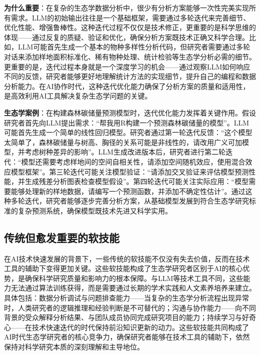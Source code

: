 \documentclass[
]{book}
\begin{document}
\textbf{为什么重要}：在复杂的生态学数据分析中，很少有分析方案能够一次性完美实现所有需求。LLM的初始输出往往是一个基础框架，需要通过多轮迭代来完善细节、优化性能、增强鲁棒性。这种迭代过程不仅仅是技术修正，更重要的是科学思维的体现------通过反复的质疑、验证和优化，确保分析方案既技术正确又科学合理。比如，LLM可能首先生成一个基本的物种多样性分析代码，但研究者需要通过多轮对话来添加样地面积标准化、稀有物种处理、统计检验等生态学分析必需的细节。更重要的是，迭代过程本身就是一个深度学习的机会------通过观察LLM如何响应不同的反馈，研究者能够更好地理解统计方法的实现细节，提升自己的编程和数据分析能力。在AI协作时代，这种迭代优化能力确保了分析方案的质量和适用性，是高效利用AI工具解决复杂生态学问题的关键。

\textbf{生态学案例}：在构建森林碳储量预测模型时，迭代优化能力发挥着关键作用。假设研究者首先向LLM提出需求：``帮我用R构建一个预测森林碳储量的模型''。LLM可能首先生成一个简单的线性回归模型。研究者通过第一轮迭代反馈：``这个模型太简单了，森林碳储量与树高、胸径的关系可能是非线性的，请改用广义可加模型，并考虑树种差异的影响''。LLM生成改进版本后，研究者进行第二轮迭代：``模型还需要考虑样地间的空间自相关性，请添加空间随机效应，使用混合效应模型框架''。第三轮迭代可能关注模型验证：``请添加交叉验证来评估模型预测性能，并生成残差分析图表检查模型假设''。第四轮迭代可能关注实际应用：``模型需要能够处理新的样地数据，请编写一个预测函数，并添加不确定性估计''。通过这种多轮迭代，研究者能够逐步完善分析方案，从基础模型发展到符合生态学研究标准的复杂预测系统，确保模型既技术先进又科学实用。

\hypertarget{ux4f20ux7edfux4f46ux6108ux53d1ux91cdux8981ux7684ux8f6fux6280ux80fd}{%
\subsection{传统但愈发重要的软技能}\label{ux4f20ux7edfux4f46ux6108ux53d1ux91cdux8981ux7684ux8f6fux6280ux80fd}}

在AI技术快速发展的背景下，一些传统的软技能不仅没有失去价值，反而在技术工具的辅助下变得更加关键。这些软技能构成了生态学研究者区别于AI的核心优势，是确保科学研究质量和影响力的根本保障。与LLM等技术工具不同，这些能力无法通过算法训练获得，而是需要通过长期的学术实践和人文素养培养来建立。具体包括：数据分析调试与问题排查能力------当复杂的生态学分析流程出现异常时，人类研究者的逻辑推理和经验判断是不可替代的；沟通与协作能力------向不同背景的受众解释分析结果、与团队成员协同完成研究项目的能力；持续学习与好奇心------在技术快速迭代的时代保持前沿知识更新的动力。这些软技能共同构成了AI时代生态学研究者的核心竞争力，确保研究者能够在技术工具的辅助下，依然保持对科学研究本质的深刻理解和主导地位。
\end{document}
